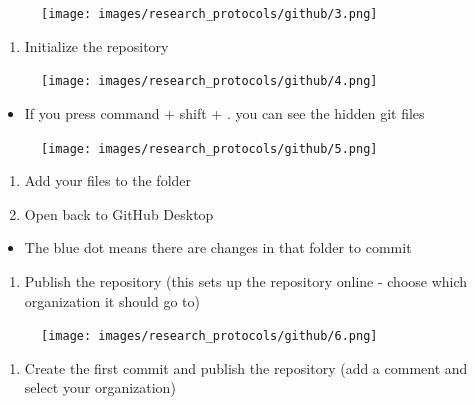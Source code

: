 \documentclass[
]{book}
\providecommand{\tightlist}{%
  \setlength{\itemsep}{0pt}\setlength{\parskip}{0pt}}
\begin{document}
\begin{figure}
\centering
\texttt{[image: images/research\_protocols/github/3.png]}
\caption{}
\end{figure}

\begin{enumerate}
\def\labelenumi{\arabic{enumi}.}
\setcounter{enumi}{2}
\tightlist
\item
  Initialize the repository
\end{enumerate}

\begin{figure}
\centering
\texttt{[image: images/research\_protocols/github/4.png]}
\caption{}
\end{figure}

\begin{itemize}
\tightlist
\item
  If you press command + shift + . you can see the hidden git files
\end{itemize}

\begin{figure}
\centering
\texttt{[image: images/research\_protocols/github/5.png]}
\caption{}
\end{figure}

\begin{enumerate}
\def\labelenumi{\arabic{enumi}.}
\setcounter{enumi}{3}
\item
  Add your files to the folder
\item
  Open back to GitHub Desktop
\end{enumerate}

\begin{itemize}
\tightlist
\item
  The blue dot means there are changes in that folder to commit
\end{itemize}

\begin{enumerate}
\def\labelenumi{\arabic{enumi}.}
\setcounter{enumi}{5}
\tightlist
\item
  Publish the repository (this sets up the repository online - choose which organization it should go to)
\end{enumerate}

\begin{figure}
\centering
\texttt{[image: images/research\_protocols/github/6.png]}
\caption{}
\end{figure}

\begin{enumerate}
\def\labelenumi{\arabic{enumi}.}
\setcounter{enumi}{6}
\tightlist
\item
  Create the first commit and publish the repository (add a comment and select your organization)
\end{enumerate}
\end{document}
